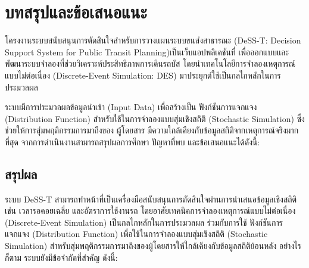 \chapter{บทสรุปและข้อเสนอแนะ}
\begin{mypara}
    \indent โครงงานระบบสนับสนุนการตัดสินใจสําหรับการวางแผนระบบขนส่งสาธารณะ 
(DeSS-T: Decision Support System for Public Transit Planning)เป็นเว็บแอปพลิเคชันที่
 เพื่อออกแบบและพัฒนาระบบจำลองที่ช่วยวิเคราะห์ประสิทธิภาพการเดินรถบัส 
โดยนำเทคโนโลยีการจำลองเหตุการณ์แบบไม่ต่อเนื่อง (Discrete-Event Simulation: DES) 
มาประยุกต์ใช้เป็นกลไกหลักในการประมวลผล
\end{mypara}

\begin{mypara}
    \indent ระบบมีการประมวลผลข้อมูลนำเข้า (Input Data) เพื่อสร้างเป็น ฟังก์ชันการแจกแจง (Distribution Function)
สำหรับใช้ในการจำลองแบบสุ่มเชิงสถิติ (Stochastic Simulation) ซึ่งช่วยให้การสุ่มพฤติกรรมการมาถึงของ
ผู้โดยสาร มีความใกล้เคียงกับข้อมูลสถิติจากเหตุการณ์จริงมากที่สุด
จากการดำเนินงานสามารถสรุปผลการศึกษา ปัญหาที่พบ และข้อเสนอแนะได้ดังนี้:
\end{mypara}



\section{สรุปผล}
ระบบ DeSS-T สามารถทำหน้าที่เป็นเครื่องมือสนับสนุนการตัดสินใจผ่านการนำเสนอข้อมูลเชิงสถิติ 
เช่น เวลารอคอยเฉลี่ย และอัตราการใช้งานรถ โดยอาศัยเทคนิคการจำลองเหตุการณ์แบบไม่ต่อเนื่อง 
(Discrete-Event Simulation) เป็นกลไกหลักในการประมวลผล ร่วมกับการใช้ ฟังก์ชันการแจกแจง 
(Distribution Function) เพื่อใช้ในการจำลองแบบสุ่มเชิงสถิติ (Stochastic Simulation) 
สำหรับสุ่มพฤติกรรมการมาถึงของผู้โดยสารให้ใกล้เคียงกับข้อมูลสถิติย้อนหลัง อย่างไรก็ตาม 
ระบบยังมีข้อจำกัดที่สำคัญ ดังนี้:

